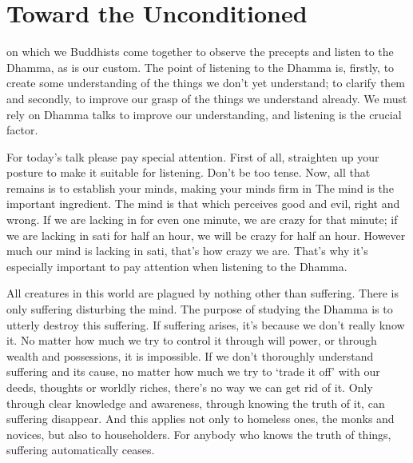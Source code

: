 
\chapter{Toward the Unconditioned}

 on which we Buddhists come together to observe the  precepts and listen to the Dhamma, as is our custom. The point of listening to the Dhamma is, firstly, to create some understanding of the things we don't yet understand; to clarify them and secondly, to improve our grasp of the things we understand already. We must rely on Dhamma talks to improve our understanding, and listening is the crucial factor. 

For today's talk please pay special attention. First of all, straighten up your posture to make it suitable for listening. Don't be too tense. Now, all that remains is to establish your minds, making your minds firm in  The mind is the important ingredient. The mind is that which perceives good and evil, right and wrong. If we are lacking in  for even one minute, we are crazy for that minute; if we are lacking in sati for half an hour, we will be crazy for half an hour. However much our mind is lacking in sati, that's how crazy we are. That's why it's especially important to pay attention when listening to the Dhamma. 

All creatures in this world are plagued by nothing other than suffering. There is only suffering disturbing the mind. The purpose of studying the Dhamma is to utterly destroy this suffering. If suffering arises, it's because we don't really know it. No matter how much we try to control it through will power, or through wealth and possessions, it is impossible. If we don't thoroughly understand suffering and its cause, no matter how much we try to `trade it off' with our deeds, thoughts or worldly riches, there's no way we can get rid of it. Only through clear knowledge and awareness, through knowing the truth of it, can suffering disappear. And this applies not only to homeless ones, the monks and novices, but also to householders. For anybody who knows the truth of things, suffering automatically ceases. 

